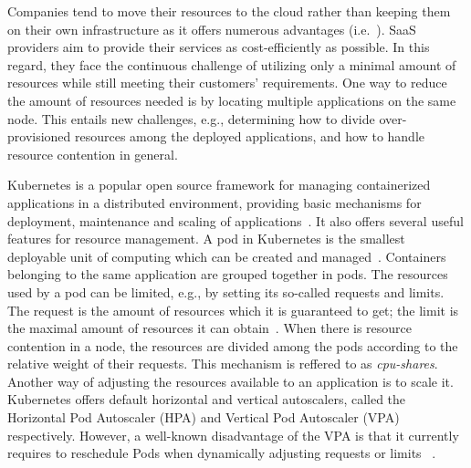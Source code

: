 Companies tend to move their resources to the cloud rather than keeping them on their own infrastructure as it offers numerous advantages (i.e.~\citep{AhmadiM.2018Caao}). SaaS providers aim to provide their services as cost-efficiently as possible. In this regard, they face the continuous challenge of utilizing only a minimal amount of resources while still meeting their customers' requirements. One way to reduce the amount of resources needed is by locating multiple applications on the same node. This entails new challenges, e.g., determining how to divide over-provisioned resources among the deployed applications, and how to handle resource contention in general. 

Kubernetes is a popular open source framework for managing containerized applications in a distributed environment, providing basic mechanisms for deployment, maintenance and scaling of applications~\citep{kubernetes_github}. It also offers several useful features for resource management. 
A pod in Kubernetes is the smallest deployable unit of computing which can be created and managed~\citep{pod}. Containers belonging to the same application are grouped together in pods. 
The resources used by a pod can be limited, e.g., by setting its so-called requests and limits. The request is the amount of resources which it is guaranteed to get; the limit is the maximal amount of resources it can obtain~\citep{requestlimit}. When there is resource contention in a node, the resources are divided among the pods according to the relative weight of their requests. This mechanism is reffered to as \textit{cpu-shares}. Another way of adjusting the resources available to an application is to scale it. Kubernetes offers default horizontal and vertical autoscalers, called the Horizontal Pod Autoscaler (HPA) and Vertical Pod Autoscaler (VPA) respectively. However, a well-known disadvantage of the VPA is that it currently requires to reschedule Pods when dynamically adjusting requests or limits ~\citep{in-place-pod-resources-updates}.%

